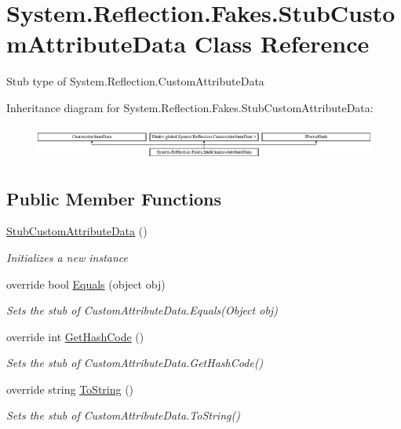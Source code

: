 \hypertarget{class_system_1_1_reflection_1_1_fakes_1_1_stub_custom_attribute_data}{\section{System.\-Reflection.\-Fakes.\-Stub\-Custom\-Attribute\-Data Class Reference}
\label{class_system_1_1_reflection_1_1_fakes_1_1_stub_custom_attribute_data}
}


Stub type of System.\-Reflection.\-Custom\-Attribute\-Data 


Inheritance diagram for System.\-Reflection.\-Fakes.\-Stub\-Custom\-Attribute\-Data\-:\begin{figure}[H]
\begin{center}
\leavevmode
\includegraphics[height=1.138211cm]{class_system_1_1_reflection_1_1_fakes_1_1_stub_custom_attribute_data}
\end{center}
\end{figure}
\subsection*{Public Member Functions}
\begin{DoxyCompactItemize}
\item 
\hyperlink{class_system_1_1_reflection_1_1_fakes_1_1_stub_custom_attribute_data_ad20521da1091eaef111f72038751312c}{Stub\-Custom\-Attribute\-Data} ()
\begin{DoxyCompactList}\small\item\em Initializes a new instance\end{DoxyCompactList}\item 
override bool \hyperlink{class_system_1_1_reflection_1_1_fakes_1_1_stub_custom_attribute_data_a66c3a09ff84a578c3b953d1146ab126f}{Equals} (object obj)
\begin{DoxyCompactList}\small\item\em Sets the stub of Custom\-Attribute\-Data.\-Equals(\-Object obj)\end{DoxyCompactList}\item 
override int \hyperlink{class_system_1_1_reflection_1_1_fakes_1_1_stub_custom_attribute_data_a368c63941ed6e511d7ab2391854a112f}{Get\-Hash\-Code} ()
\begin{DoxyCompactList}\small\item\em Sets the stub of Custom\-Attribute\-Data.\-Get\-Hash\-Code()\end{DoxyCompactList}\item 
override string \hyperlink{class_system_1_1_reflection_1_1_fakes_1_1_stub_custom_attribute_data_ad10505d8c2c308e9db999e51e37ce128}{To\-String} ()
\begin{DoxyCompactList}\small\item\em Sets the stub of Custom\-Attribute\-Data.\-To\-String()\end{DoxyCompactList}\end{DoxyCompactItemize}

